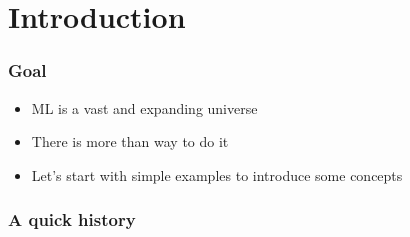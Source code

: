 \section{Introduction}

\begin{frame}
  \frametitle{Goal}
  \begin{itemize}
  \item \ac{ML} is a vast and expanding universe
  \item There is more than way to do it
  \item Let's start with simple examples to introduce some concepts
  \end{itemize}
\end{frame}

\begin{frame}
  \frametitle{A quick history}

\end{frame}
